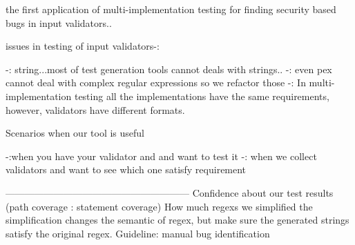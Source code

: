 the first application of multi-implementation testing for finding security based bugs in input validators..


issues in testing of input validators-:

-: string...most of test generation tools cannot deals with strings..
-: even pex cannot deal with complex regular expressions so we refactor those
-: In multi-implementation testing all the implementations have the same requirements, however, validators have different formats.

Scenarios when our tool is useful

-:when you have your validator and and want to test it
-: when we collect validators and want to see which one satisfy requirement


---------------------------------------------------------
Confidence about our test results
(path coverage : statement coverage)
How much regexs we simplified
the simplification changes the semantic of regex, but make sure the generated strings satisfy the original regex.
Guideline: manual bug identification

